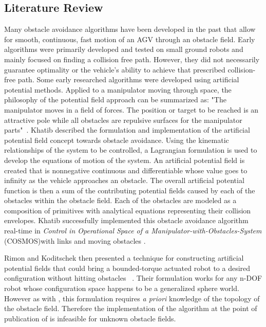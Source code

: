 \documentclass[12pt,onecolumn]{article}
\begin{document}


\subsection{Literature Review}\label{ss:LiteratureReview}

Many obstacle avoidance algorithms have been developed in the past that allow for smooth, continuous, fast motion of an AGV through an obstacle field. Early algorithms were primarily developed and tested on small ground robots and mainly focused on finding a collision free path. However, they did not necessarily guarantee optimality or the vehicle's ability to achieve that prescribed collision-free path. Some early researched algorithms were developed using artificial potential methods. Applied to a manipulator moving through space, the philosophy of the potential field approach can be summarized as: "The manipulator moves in a field of forces. The position or target to be reached is an attractive pole while all obstacles are repulsive surfaces for the manipulator parts"~\cite{Khatib1986}. Khatib described the formulation and implementation of the artificial potential field concept towards obstacle avoidance. Using the kinematic relationships of the system to be controlled, a Lagrangian formulation is used to develop the equations of motion of the system. An artificial potential field is created that is nonnegative continuous and differentiable whose value goes to infinity as the vehicle approaches an obstacle. The overall artificial potential function is then a sum of the contributing potential fields caused by each of the obstacles within the obstacle field. Each of the obstacles are modeled as a composition of primitives with analytical equations representing their collision envelopes. Khatib successfully implemented this obstacle avoidance algorithm real-time in \textit{Control in Operational Space of a Manipulator-with-Obstacles-System} (COSMOS)with links and moving obstacles \cite{Khatib1986}. 

Rimon and Koditschek then presented a technique for constructing artificial potential fields that could bring a bounded-torque actuated robot to a desired configuration without hitting obstacles ~\cite{Rimon&Koditschek1992}. Their formulation works for any n-DOF robot whose configuration space happens to be a generalized sphere world. However as with \cite{Khatib1986}, this formulation requires \textit{a priori} knowledge of the topology of the obstacle field. Therefore the implementation of the algorithm at the point of publication of \cite{Rimon&Koditschek1992} is infeasible for unknown obstacle fields. 
\end{document}
